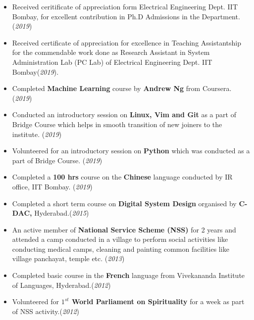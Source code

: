 \documentclass[10pt]{article}
\begin{document}
\begin{itemize}
        \item {Received ceritificate of appreciation form Electrical Engineering Dept. IIT Bombay, for excellent contribution in Ph.D Admissions in the Department}. \hfill{(\textit{2019})}
        \item {Received certificate of appreciation for excellence in Teaching Assistantship for the commendable work done as Research Assistant in System Administration Lab (PC Lab) of Electrical Engineering Dept. IIT Bombay}\hfill{(\textit{2019})}. 
	\item {Completed \textbf{Machine Learning} course by \textbf{Andrew Ng} from Coursera. }\hfill{(\textit{2019})}
	\item {Conducted an introductory session on \textbf{Linux, Vim and Git} as a part of Bridge Course which helps in smooth transition of new joiners to the institute. }\hfill{(\textit{2019})}
	\item {Volunteered for an introductory session on \textbf{Python} which was conducted as a part of Bridge Course.}
	\hfill{(\textit{2019})}
    \item {Completed a \textbf{100 hrs} course on the \textbf{Chinese} language conducted by IR office, IIT Bombay. }\hfill{(\textit{2019})}
    \item {Completed a short term course on \textbf{Digital System Design} organised by \textbf{C-DAC,} Hyderabad.}\hfill{(\textit{2015})}
	\item {An active member of \textbf{National Service Scheme (NSS)} for 2 years and attended a camp conducted in a village to perform social activities like conducting medical camps, cleaning and painting common facilities like village panchayat, temple etc.} \hfill{(\textit{2013})}
     \item {Completed basic course in the \textbf{French} language from Vivekananda Institute of Languages, Hyderabad.}\hfill{(\textit{2012})}
   	\item {Volunteered for \textbf{$1^{st}$ World Parliament on Spirituality} for a week as part of NSS activity.}\hfill{(\textit{2012})}
    
    
\end{itemize}

\end{document}
